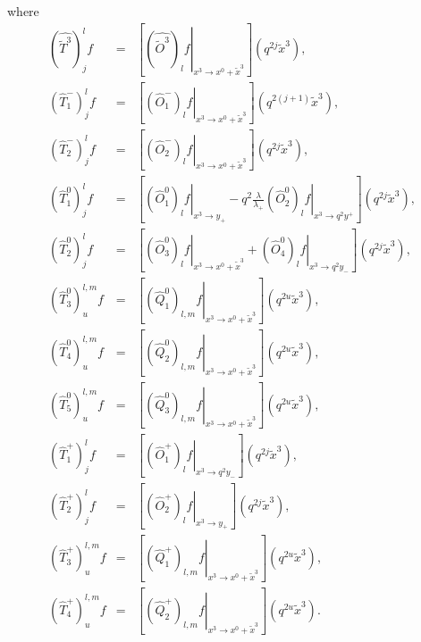 \documentclass[a4paper,11pt,oneside]{article}
\begin{document}
where
\begin{eqnarray}
\left(\hat{\tilde{T}^3}\right)^l_jf&=& \left[ \left.
\left( \hat{\tilde{O}^{3}}\right) _{l}f\right| _{x^{3}\rightarrow x^{0}+%
\tilde{x}^{3}}\right] \left( q^{2j}\tilde{x}^{3}\right),\\[0.16in]
\left(\hat{T}_1^-\right)^l_jf&=&\left[ \left. \left( \hat{O}_{1}^{-}\right)
_{l}f\right| _{x^{3}\rightarrow x^{0}+\tilde{x}^{3}}\right] \left(
q^{2\left( j+1\right) }\tilde{x}^{3}\right),\\
\left(\hat{T}^-_2\right)^l_jf&=&\left[ \left. \left( \hat{O}_{2}^{-}\right)
_{l}f\right| _{x^{3}\rightarrow x^{0}+\tilde{x}^{3}}\right] \left( q^{2j}%
\tilde{x}^{3}\right), \nonumber\\[0.16in]
\left(\hat{T}^0_1\right)^l_jf&=&\left[ \left. \left( \hat{O}_{1}^{0}\right)
_{l}f\right| _{x^{3}\rightarrow y_{+}}-q^{2}\frac{\lambda }{\lambda _{+}}%
\left. \left( \hat{O}_{2}^{0}\right) _{l}f\right| _{x^{3}\rightarrow
q^{2}y^{+}}\right] \left( q^{2j}\tilde{x}^{3}\right),\\
\left(\hat{T}^0_2\right)^l_jf&=&\left[ \left. \left( \hat{O}%
_{3}^{0}\right) _{l}f\right| _{x^{3}\rightarrow x^{0}+\tilde{x}^{3}}+\left.
\left( \hat{O}_{4}^{0}\right) _{l}f\right| _{x^{3}\rightarrow
q^{2}y_{-}}\right] \left( q^{2j}\tilde{x}^{3}\right),\nonumber\\
\left(\hat{T}^0_3\right)^{l,m}_uf&=&\left[ \left. \left( \hat{Q}_{1}^{0}\right)
_{l,m}f\right| _{x^{3}\rightarrow x^{0}+\tilde{x}^{3}}\right] \left( q^{2u}%
\tilde{x}^{3}\right),\nonumber\\
\left(\hat{T}^0_4\right)^{l,m}_uf&=&
\left[ \left. \left( \hat{Q}_{2}^{0}\right)
_{l,m}f\right| _{x^{3}\rightarrow x^{0}+\tilde{x}^{3}}\right] \left( q^{2u}%
\tilde{x}^{3}\right),\nonumber\\
\left(\hat{T}^0_5\right)^{l,m}_uf&=&
\left[ \left. \left( \hat{Q}_{3}^{0}\right)
_{l,m}f\right| _{x^{3}\rightarrow x^{0}+\tilde{x}^{3}}\right] \left( q^{2u}%
\tilde{x}^{3}\right),\nonumber \\[0.16in]
\left(\hat{T}^+_1\right)_j^lf&=&
\left[ \left. \left( \hat{O}_{1}^{+}\right) _{l}f\right| _{x^{3}\rightarrow
q^{2}y_{-}}\right] \left( q^{2j}\tilde{x}^{3}\right),\\
\left(\hat{T}^+_2\right)_j^lf&=&
\left[ \left. \left( \hat{O}_{2}^{+}\right)
_{l}f\right| _{x^{3}\rightarrow y_{+}}\right] \left( q^{2j}\tilde{x}%
^{3}\right),\nonumber\\
\left(\hat{T}^+_3\right)_u^{l,m}f&=&
 \left[ \left. \left( \hat{Q}_{1}^{+}\right)
_{l,m}f\right| _{x^{3}\rightarrow x^{0}+\tilde{x}^{3}}\right] \left( q^{2u}%
\tilde{x}^{3}\right),\nonumber\\
\left(\hat{T}^+_4\right)^{l,m}_uf&=&
\left[ \left. \left( \hat{Q}_{2}^{+}\right)
_{l,m}f\right| _{x^{3}\rightarrow x^{0}+\tilde{x}^{3}}\right] \left( q^{2u}%
\tilde{x}^{3}\right).\nonumber
\end{eqnarray}
\end{document}

